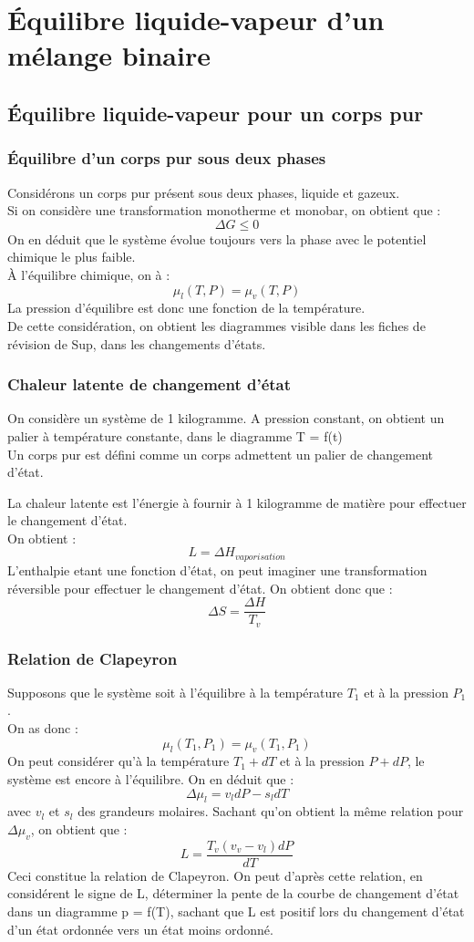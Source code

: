 \chapter{Équilibre liquide-vapeur d'un mélange binaire}
\section{Équilibre liquide-vapeur pour un corps pur}
\subsection{Équilibre d'un corps pur sous deux phases}
Considérons un corps pur présent sous deux phases, liquide et gazeux.\\
Si on considère une transformation monotherme et monobar, on obtient que :
$$\Delta G \leq 0$$
On en déduit que le système évolue toujours vers la phase avec le potentiel chimique le plus faible.\\
À l'équilibre chimique, on à :
$$\mu_l(T,P) = \mu_v(T,P)$$
La pression d'équilibre est donc une fonction de la température.\\
De cette considération, on obtient les diagrammes visible dans les fiches de révision de Sup, dans les changements d'états.
\subsection{Chaleur latente de changement d'état}
\begin{de}
On considère un système de 1 kilogramme. A pression constant, on obtient un palier à température constante, dans le diagramme T = f(t)\\
Un corps pur est défini comme un corps admettent un palier de changement d'état.
\end{de}
\begin{de}
La chaleur latente est l'énergie à fournir à 1 kilogramme de matière pour effectuer le changement d'état.\\
On obtient :
$$L = \Delta H_{vaporisation}$$
L'enthalpie etant une fonction d'état, on peut imaginer une transformation réversible pour effectuer le changement d'état. On obtient donc que : 
$$\Delta S = \dfrac{\Delta H}{T_v}$$
\end{de}
\subsection{Relation de Clapeyron}
Supposons que le système soit à l'équilibre à la température $T_1$ et à la pression $P_1$.\\
On as donc : 
$$\mu_l(T_1,P_1) = \mu_v(T_1,P_1)$$
On peut considérer qu'à la température $T_1 + dT$ et à la pression $P + dP$, le système est encore à l'équilibre.
On en déduit que :
$$\Delta  \mu_l = v_ldP - s_ldT$$
avec $v_l$ et $s_l$ des grandeurs molaires. Sachant qu'on obtient la même relation pour $\Delta \mu_v$, on obtient que : 
$$L = \dfrac{T_v(v_v-v_l)dP}{dT}$$
Ceci constitue la relation de Clapeyron. On peut d'après cette relation, en considérent le signe de L, déterminer la pente de la courbe de changement d'état dans un diagramme p = f(T), sachant que L est positif lors du changement d'état d'un état ordonnée vers un état moins ordonné.
